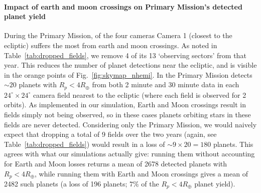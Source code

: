 \paragraph{Impact of earth and moon crossings on Primary Mission's detected planet yield}
During the Primary Mission, of the four cameras Camera 1 (closest to the ecliptic) suffers the most from earth and moon crossings.
As noted in Table~\ref{tab:dropped_fields}, we remove 4 of its 13 
`observing sectors' from that year.
This reduces the number of planet detections near the ecliptic, and is visible in the orange points of Fig.~\ref{fig:skymap_nhemi}.
In the Primary Mission \tess detects $\sim20$ planets with $R_p<4R_\oplus$ from both 2 minute and 30 minute data in each $24^\circ\times24^\circ$ camera field nearest to the ecliptic (where each field is observed for 2 \tess orbits).
As implemented in our simulation, Earth and Moon crossings result in fields simply not being observed, so in these cases planets orbiting stars in these fields are never detected.
Considering only the Primary Mission, we would naively expect that dropping a total of 9 fields over the two years (again, see Table~\ref{tab:dropped_fields}) would result in a loss of $\sim9\times20=180$ planets.
This agrees with what our simulations actually give: running them without accounting for Earth and Moon losses returns a mean of 2678 detected planets with $R_p<4R_\oplus$, while running them with Earth and Moon crossings gives a mean of 2482 such planets (a loss of 196 planets; $7\%$ of the $R_p<4R_\oplus$ planet yield).
